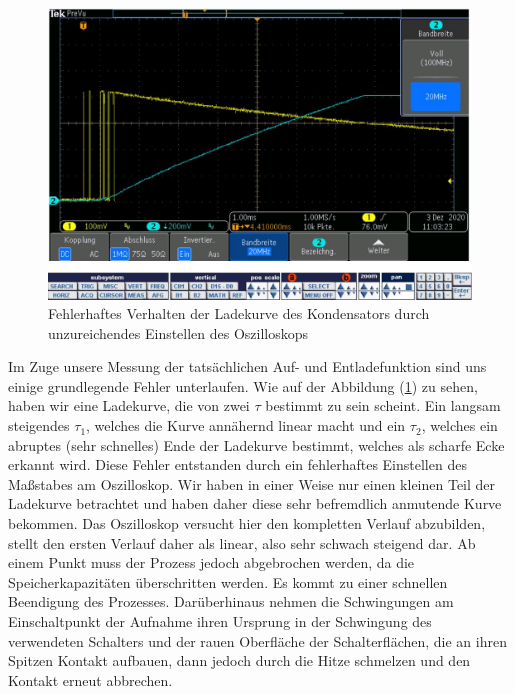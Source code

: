 \documentclass{article}
\begin{document}
\begin{figure}[h!]
  \begin{center}
    \includegraphics[scale=0.45]{../assets/images/ET2P4/aufgabe3Fehler.JPG}
    \caption{Fehlerhaftes Verhalten der Ladekurve des Kondensators durch unzureichendes Einstellen des Oszilloskops}
    \label{fig:error}
  \end{center}
\end{figure}

Im Zuge unsere Messung der tatsächlichen Auf- und Entladefunktion sind uns einige grundlegende Fehler unterlaufen. Wie auf der Abbildung (\ref{fig:error}) zu 
sehen, haben wir eine Ladekurve, die von zwei $\tau$ bestimmt zu sein scheint. Ein langsam steigendes $\tau_1$, welches die Kurve annähernd linear macht und ein 
$\tau_2$, welches ein abruptes (sehr schnelles) Ende der Ladekurve bestimmt, welches als scharfe Ecke erkannt wird. Diese Fehler entstanden durch ein fehlerhaftes Einstellen des Maßstabes am
Oszilloskop. Wir haben in einer Weise nur einen kleinen Teil der Ladekurve betrachtet und haben daher diese sehr befremdlich anmutende Kurve bekommen. Das Oszilloskop versucht hier den 
kompletten Verlauf abzubilden, stellt den ersten Verlauf daher als linear, also sehr schwach steigend dar. Ab einem Punkt muss der Prozess jedoch abgebrochen werden, da die Speicherkapazitäten überschritten werden.
Es kommt zu einer schnellen Beendigung des Prozesses.
Darüberhinaus nehmen die Schwingungen am Einschaltpunkt der Aufnahme ihren Ursprung in der Schwingung des verwendeten Schalters und der rauen Oberfläche der Schalterflächen, die an ihren Spitzen Kontakt aufbauen, dann jedoch
durch die Hitze schmelzen und den Kontakt erneut abbrechen.
\end{document}
